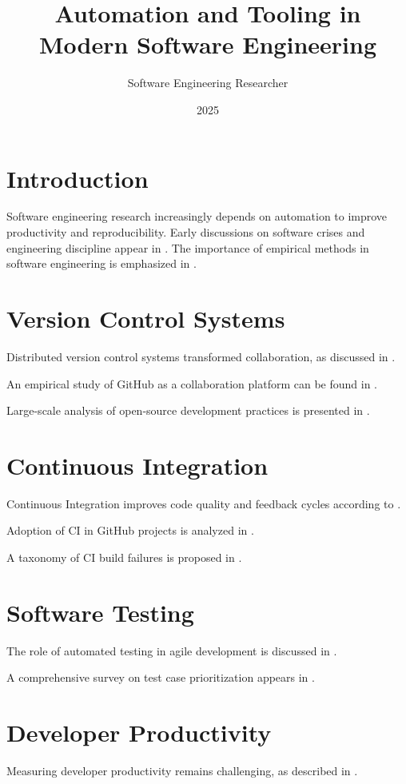 \documentclass[12pt]{article}
\title{Automation and Tooling in Modern Software Engineering}
\author{Software Engineering Researcher}
\date{2025}
\begin{document}
\maketitle
\onehalfspacing
\cite{Parnas1972onthecrite}
\section{Introduction}
Software engineering research increasingly depends on automation to improve productivity and reproducibility. Early discussions on software crises and engineering discipline appear in \cite{IEEEieeestanda}.
\cite{Kervinen2006modelbased}
The importance of empirical methods in software engineering is emphasized in \cite{Vandewoude2007tranquilit}.

\section{Version Control Systems}
Distributed version control systems transformed collaboration, as discussed in \cite{IEEEieeestanda}.

An empirical study of GitHub as a collaboration platform can be found in \cite{Chamberlain2017assessingu}.

Large-scale analysis of open-source development practices is presented in \cite{Majumder2014anelementa}.

\section{Continuous Integration}
Continuous Integration improves code quality and feedback cycles according to \cite{IEEEieeestanda}.

Adoption of CI in GitHub projects is analyzed in \cite{Davies2017atargeteds}.

A taxonomy of CI build failures is proposed in \cite{IEEEieeestanda}.

\section{Software Testing}
The role of automated testing in agile development is discussed in \cite{IEEEieeestanda}.

A comprehensive survey on test case prioritization appears in \cite{Cataldo2009softwarede}.

\section{Developer Productivity}
Measuring developer productivity remains challenging, as described in \cite{Baldwin2015canweflipn}.
\end{document}
